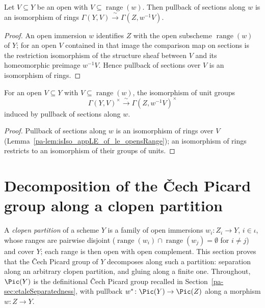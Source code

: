 \begin{lemma}
  \label{pa-lem:isIso_appLE_of_le_opensRange}
  \leanok

  Let \(V \subseteq Y\) be an open with \(V \subseteq \operatorname{range}(w)\). Then pullback of
  sections along \(w\) is an isomorphism of rings
  \(\Gamma(Y, V) \xrightarrow{\ \sim\ } \Gamma(Z, w^{-1}V)\).
\end{lemma}
\begin{proof}
  \leanok
  An open immersion \(w\) identifies \(Z\) with the open subscheme \(\operatorname{range}(w)\) of
  \(Y\); for an open \(V\) contained in that image the comparison map on sections is the
  restriction isomorphism of the structure sheaf between \(V\) and its homeomorphic preimage
  \(w^{-1}V\). Hence pullback of sections over \(V\) is an isomorphism of rings.
\end{proof}

\begin{definition}
  \label{pa-def:unitsPreimageEquiv}
  \leanok

  For an open \(V \subseteq Y\) with \(V \subseteq \operatorname{range}(w)\), the isomorphism of
  unit groups
  \[
    \Gamma(Y, V)^{\times} \xrightarrow{\ \sim\ } \Gamma(Z, w^{-1}V)^{\times}
  \]
  induced by pullback of sections along \(w\).
\end{definition}
\begin{proof}
  \leanok
  Pullback of sections along \(w\) is an isomorphism of rings over \(V\)
  (Lemma~\ref{pa-lem:isIso_appLE_of_le_opensRange}); an isomorphism of rings restricts to an
  isomorphism of their groups of units.
\end{proof}

\section{Decomposition of the \v Cech Picard group along a clopen partition}

A \emph{clopen partition} of a scheme \(Y\) is a family of open immersions
\(w_i \colon Z_i \to Y\), \(i \in \iota\), whose ranges are pairwise disjoint
(\(\operatorname{range}(w_i) \cap \operatorname{range}(w_j) = \emptyset\) for \(i \ne j\)) and
cover \(Y\); each range is then open with open complement. This section proves that the \v Cech
Picard group of \(Y\) decomposes along such a partition: separation along an arbitrary clopen
partition, and gluing along a finite one. Throughout, \(\Pic(Y)\) is the definitional \v Cech
Picard group recalled in Section~\ref{pa-sec:etaleSeparatedness}, with pullback
\(w^{*} \colon \Pic(Y) \to \Pic(Z)\) along a morphism \(w \colon Z \to Y\).

